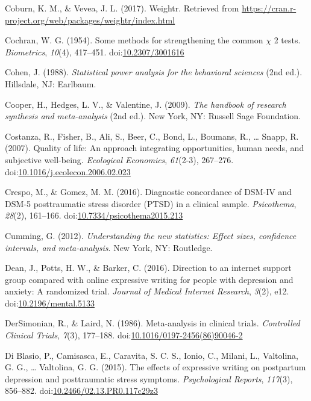 \documentclass[man]{apa6}
\theoremstyle{definition}
\theoremstyle{definition}
\theoremstyle{definition}
\theoremstyle{remark}
\begin{document}
\hypertarget{ref-Coburn2017}{}
Coburn, K. M., \& Vevea, J. L. (2017). Weightr. Retrieved from
\url{https://cran.r-project.org/web/packages/weightr/index.html}

\hypertarget{ref-Cochran1954}{}
Cochran, W. G. (1954). Some methods for strengthening the common
\(\chi\) 2 tests. \emph{Biometrics}, \emph{10}(4), 417--451.
doi:\href{https://doi.org/10.2307/3001616}{10.2307/3001616}

\hypertarget{ref-Cohen1988}{}
Cohen, J. (1988). \emph{Statistical power analysis for the behavioral
sciences} (2nd ed.). Hillsdale, NJ: Earlbaum.

\hypertarget{ref-Cooper2009}{}
Cooper, H., Hedges, L. V., \& Valentine, J. (2009). \emph{The handbook
of research synthesis and meta-analysis} (2nd ed.). New York, NY:
Russell Sage Foundation.

\hypertarget{ref-Costanza2007}{}
Costanza, R., Fisher, B., Ali, S., Beer, C., Bond, L., Boumans, R.,
\ldots{} Snapp, R. (2007). Quality of life: An approach integrating
opportunities, human needs, and subjective well-being. \emph{Ecological
Economics}, \emph{61}(2-3), 267--276.
doi:\href{https://doi.org/10.1016/j.ecolecon.2006.02.023}{10.1016/j.ecolecon.2006.02.023}

\hypertarget{ref-Crespo2016}{}
Crespo, M., \& Gomez, M. M. (2016). Diagnostic concordance of DSM-IV and
DSM-5 posttraumatic stress disorder (PTSD) in a clinical sample.
\emph{Psicothema}, \emph{28}(2), 161--166.
doi:\href{https://doi.org/10.7334/psicothema2015.213}{10.7334/psicothema2015.213}

\hypertarget{ref-Cumming2012}{}
Cumming, G. (2012). \emph{Understanding the new statistics: Effect
sizes, confidence intervals, and meta-analysis}. New York, NY:
Routledge.

\hypertarget{ref-Dean2016}{}
Dean, J., Potts, H. W., \& Barker, C. (2016). Direction to an internet
support group compared with online expressive writing for people with
depression and anxiety: A randomized trial. \emph{Journal of Medical
Internet Research}, \emph{3}(2), e12.
doi:\href{https://doi.org/10.2196/mental.5133}{10.2196/mental.5133}

\hypertarget{ref-DerSimonian1986}{}
DerSimonian, R., \& Laird, N. (1986). Meta-analysis in clinical trials.
\emph{Controlled Clinical Trials}, \emph{7}(3), 177--188.
doi:\href{https://doi.org/10.1016/0197-2456(86)90046-2}{10.1016/0197-2456(86)90046-2}

\hypertarget{ref-Blasio2015a}{}
Di Blasio, P., Camisasca, E., Caravita, S. C. S., Ionio, C., Milani, L.,
Valtolina, G. G., \ldots{} Valtolina, G. G. (2015). The effects of
expressive writing on postpartum depression and posttraumatic stress
symptoms. \emph{Psychological Reports}, \emph{117}(3), 856--882.
doi:\href{https://doi.org/10.2466/02.13.PR0.117c29z3}{10.2466/02.13.PR0.117c29z3}
\end{document}
